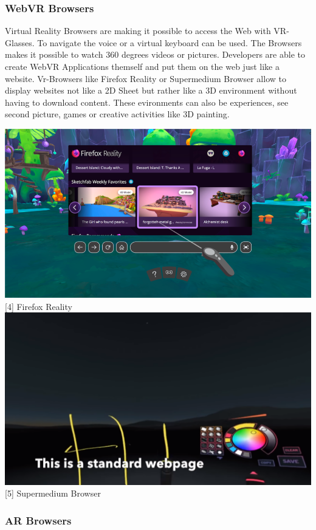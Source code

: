 \documentclass[runningheads]{llncs}
\begin{document}
			\subsubsection{WebVR Browsers}
			Virtual Reality Browsers are making it possible to access the Web with VR-Glasses. To navigate the voice or a virtual keyboard can be used. The Browsers makes it possible to watch 360 degrees videos or pictures. Developers are able to create WebVR Applications themself and put them on the web just like a website. Vr-Browsers like Firefox Reality or Supermedium Browser allow to display websites not like a 2D Sheet but rather like a 3D environment without having to download content. These evironments can also be experiences, see second picture, games or creative activities like 3D painting.
			\begin{center}
				\includegraphics[scale=0.35]{Firefox_Reality.png}
				[4]	Firefox Reality
				\includegraphics[scale=0.35]{Supermedium.png}
				[5] Supermedium Browser
			\end{center}
			\subsubsection{AR Browsers}
			
\end{document}
